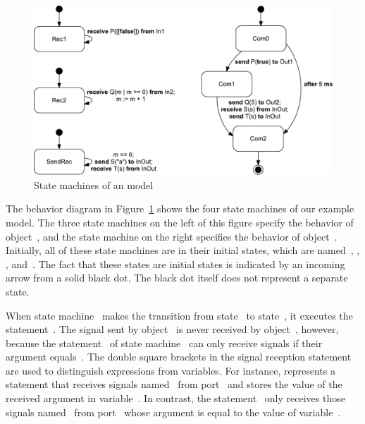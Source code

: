 \begin{figure}[hbt]
  \centering
  \includegraphics[scale=0.45]{slco/figs/CoreWithTime/Behavior_CoreWithTime}
  \caption{State machines of an \SLCO model}
  \label{fig:slco:SLCOExampleSMS}
\end{figure}

The behavior diagram in Figure~\ref{fig:slco:SLCOExampleSMS} shows the four state machines of our example model.
The three state machines on the left of this figure specify the behavior of object~, and the state machine on the right specifies the behavior of object~.
Initially, all of these state machines are in their initial states, which are named~, , , and~.
The fact that these states are initial states is indicated by an incoming arrow from a solid black dot.
The black dot itself does not represent a separate state.

When state machine~ makes the transition from state~ to state~, it executes the statement~.
The signal sent by object~ is never received by object~, however, because the statement~ of state machine~ can only receive signals if their argument equals~\SLCOFalse.
The double square brackets in the signal reception statement are used to distinguish expressions from variables.
For instance,  represents a statement that receives signals named~ from port~ and stores the value of the received argument in variable~.
In contrast, the statement~ only receives those signals named~ from port~ whose argument is equal to the value of variable~.

